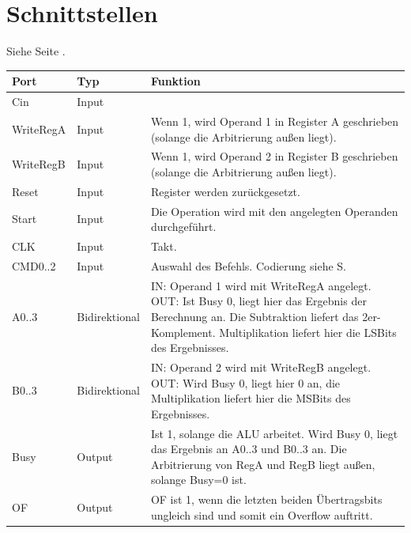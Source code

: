 \documentclass[11pt]{report}
\begin{document}
	
	
	\section{Schnittstellen}
	Siehe Seite \pageref{portliste}.
	\begin{table}[]
		\label{portliste}
		\centering
		\begin{tabular}{|l|l|p{11cm}|}
			\hline
			Port & Typ & Funktion \\ \hline\hline
			
			Cin & Input &  \\ \hline
			
			WriteRegA & Input & Wenn 1, wird Operand 1 in Register A geschrieben (solange die Arbitrierung außen liegt). \\ \hline
			
			WriteRegB & Input & Wenn 1, wird Operand 2 in Register B geschrieben (solange die Arbitrierung außen liegt). \\ \hline
			
			Reset & Input & Register werden zurückgesetzt. \\ \hline
			
			Start & Input & Die Operation wird mit den angelegten Operanden durchgeführt. \\ \hline
			
			CLK & Input & Takt. \\ \hline
			
			CMD0..2 & Input & Auswahl des Befehls. Codierung siehe S. \pageref{codierungstabelle} \\ \hline
			
			A0..3 & Bidirektional & IN: Operand 1 wird mit WriteRegA angelegt. OUT: Ist Busy 0, liegt hier das Ergebnis der Berechnung an. Die Subtraktion liefert das 2er-Komplement. Multiplikation liefert hier die LSBits des Ergebnisses. \\ \hline
			
			B0..3 & Bidirektional & IN: Operand 2 wird mit WriteRegB angelegt. OUT: Wird Busy 0, liegt hier 0 an, die Multiplikation liefert hier die MSBits des Ergebnisses. \\ \hline
			
			Busy & Output & Ist 1, solange die ALU arbeitet. Wird Busy 0, liegt das Ergebnis an A0..3 und B0..3 an. Die Arbitrierung von RegA und RegB liegt außen, solange Busy=0 ist. \\ \hline
			
			OF & Output & OF ist 1, wenn die letzten beiden Übertragsbits ungleich sind und somit ein Overflow auftritt. \\ \hline
			

\end{tabular}
\end{table}
\end{document}

